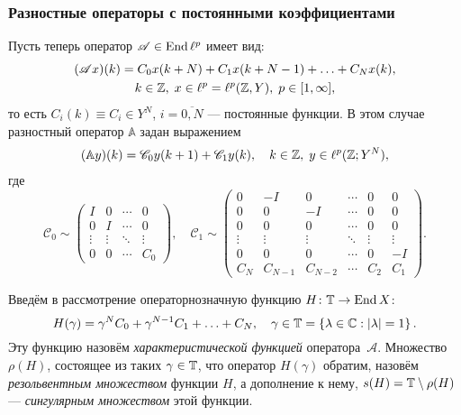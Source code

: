\documentclass{beamer}
\begin{document}
\begin{frame}
\frametitle{Разностные операторы с постоянными коэффициентами}

Пусть теперь оператор $\mathcal A \in \operatorname{End}{\ell^p}$ имеет вид:
\begin{gather*}
    (\mathcal A x)(k) = C_0 x(k + N) + C_1 x(k + N - 1) + \dotsc + C_N x(k), \\
    k \in \mathbb{Z}, \; x \in \ell^p = \ell^p(\mathbb{Z}, Y), \; p \in [1, \infty],
\end{gather*}
то есть $C_i(k) \equiv C_i \in Y^N$, $i = \overline{0,N}$ --- постоянные функции. В этом случае разностный оператор $\mathbb A$ задан выражением
\begin{align*}
    (\mathbb A y)(k) = \mathcal C_0 y(k + 1) + \mathcal C_1 y(k), \quad k \in \mathbb{Z}, \; y \in \ell^p(\mathbb{Z}; Y^N),
\end{align*}
где
\[
    \mathcal C_0 \sim \begin{pmatrix}
    I & 0 & \cdots &  0 \\
    0 & I  & \cdots &  0 \\
    \vdots & \vdots & \ddots &  \vdots \\
    0 & 0 & \cdots &  C_0
   \end{pmatrix},\quad
   \mathcal C_1 \sim \begin{pmatrix}
    0 & -I & 0  & \cdots & 0 & 0 \\
    0 & 0  & -I & \cdots & 0 & 0 \\
    0 & 0  & 0 & \cdots & 0 & 0 \\
    \vdots & \vdots & \vdots & \ddots & \vdots & \vdots \\
    0 & 0 & 0 & \cdots & 0 & -I \\
    C_N & C_{N-1} & C_{N-2} & \cdots & C_2 & C_1
   \end{pmatrix}.
\]
\end{frame}

\begin{frame}
Введём в рассмотрение операторнозначную функцию $H \colon \mathbb{T} \to \operatorname{End} X$:
\[ H(\gamma) = \gamma^N C_0 + \gamma^{N-1} C_1 + \dotsc + C_N, \quad \gamma \in \mathbb{T} = \left\{\lambda \in \mathbb{C} : \left|\lambda\right| = 1\right\}. \]
Эту функцию назовём \emph{характеристической функцией} оператора~$ \mathcal A$. Множество $\rho(H)$, состоящее из таких $\gamma \in \mathbb{T}$, что оператор $H(\gamma)$ обратим, назовём \emph{резольвентным множеством} функции $H$, а дополнение к нему, $s(H) \hm= \groupt \setminus \rho(H)$ --- \emph{сингулярным множеством} этой функции.
\end{frame}
\end{document}
